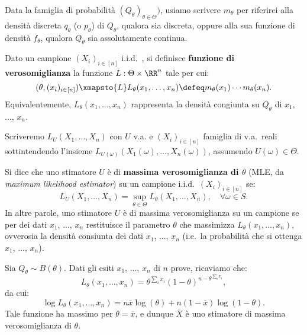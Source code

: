 \begin{multicols*}{2}
\begin{notation}
    Data la famiglia di probabilità $(Q_\theta)_{\theta \in \Theta})$, usiamo
    scrivere $m_\theta$ per riferirci alla densità discreta $q_\theta$ (o $p_\theta$)
    di $Q_\theta$, qualora sia discreta, oppure alla sua funzione di densità
    $f_\theta$, qualora $Q_\theta$ sia assolutamente continua.
\end{notation}

\begin{definition}
    Dato un campione $(X_i)_{i \in [n]}$ i.i.d.~, si definisce
    \textbf{funzione di verosomiglianza} la funzione $L : \Theta \times \RR^n$
    tale per cui:
    \[
        (\theta, (x_i)_{i \in [n]}) \xmapsto{L} L_\theta(x_1, \ldots, x_n) \defeq m_\theta(x_1) \cdots m_\theta(x_n).
    \]
    Equivalentemente, $L_\theta(x_1, \ldots, x_n)$ rappresenta la densità congiunta su $Q_\theta$
    di $x_1$, ..., $x_n$.
\end{definition}

\begin{notation}
    Scriveremo $L_U(X_1, \ldots, X_n)$ con $U$ v.a. e
    $(X_i)_{i \in [n]}$ famiglia di v.a.~reali sottintendendo
    l'insieme $L_{U(\omega)}(X_1(\omega), \ldots, X_n(\omega))$,
    assumendo $U(\omega) \in \Theta$.
\end{notation}

\begin{definition}
    Si dice che uno stimatore $U$ è di \textbf{massima verosomiglianza di $\theta$} (MLE, da
    \textit{maximum likelihood estimator})
    su un campione i.i.d.~$(X_i)_{i \in [n]}$ se:
    \[
        L_U(X_1, \ldots, X_n) = \sup_{\theta \in \Theta} L_\theta(X_1, \ldots, X_n), \quad \forall \omega \in S.
    \]
    In altre parole, uno stimatore $U$ è di massima verosomiglianza su un campione se
    per dei dati $x_1$, ..., $x_n$ restituisce il parametro $\theta$ che massimizza
    $L_\theta(x_1, \ldots, x_n)$, ovverosia la densità consiunta dei dati
    $x_1$, ..., $x_n$ (i.e.~la probabilità che si ottenga $x_1$, ..., $x_n$).
\end{definition}

\begin{example}
    Sia $Q_\theta \sim B(\theta)$. Dati gli esiti $x_1$, ..., $x_n$ di $n$ prove,
    ricaviamo che:
    \[
        L_\theta(x_1, \ldots, x_n) = \theta^{\sum_i x_i} (1 - \theta)^{n - \theta^{\sum_i x_i}},
    \]
    da cui:
    \[
        \log L_\theta(x_1, \ldots, x_n) = n \overline{x} \log(\theta) + n (1 - \overline{x}) \log(1 - \theta).
    \]
    Tale funzione ha massimo per $\theta = \overline{x}$, e dunque
    $\overline{X}$ è uno stimatore di massima verosomiglianza di $\theta$. \smallskip


\end{example}
\end{multicols*}
